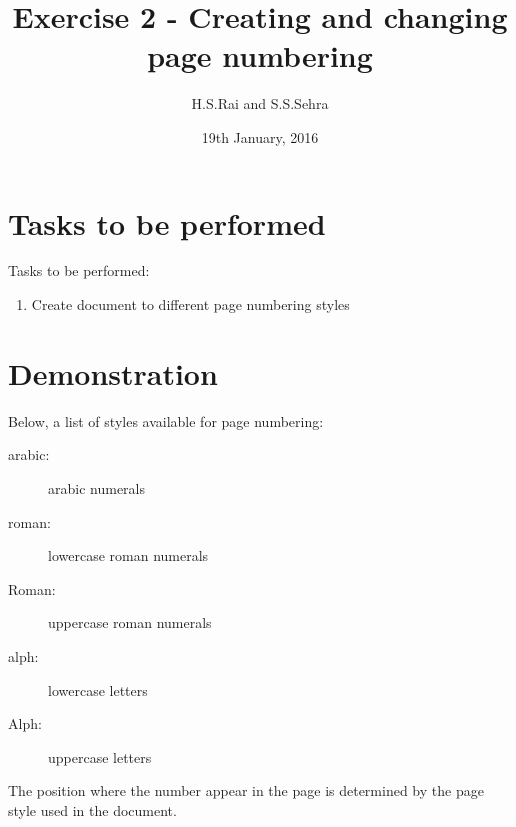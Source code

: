 \documentclass{article}
\title{Exercise 2 - Creating and changing page numbering}
\author{H.S.Rai and S.S.Sehra}
\date{19th January, 2016}
\begin{document}
		\maketitle
	
	\section*{Tasks to be performed}
	Tasks to be performed:
	\begin{enumerate}
		\item Create document to different page numbering styles
	\end{enumerate}
	\section*{Demonstration}

Below, a list of styles available for page numbering:


\begin{description}
\item[arabic:] arabic numerals

\item[roman:] lowercase roman numerals

\item[Roman:] uppercase roman numerals

\item[alph:] lowercase letters

\item[Alph:] uppercase letters
\end{description}

The position where the number appear in the page is determined by the
page style used in the document.
\end{document}

